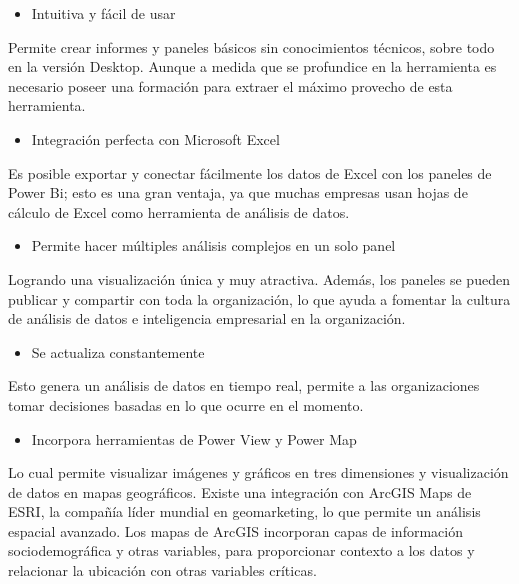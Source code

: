 \documentclass[
]{book}
\providecommand{\tightlist}{%
  \setlength{\itemsep}{0pt}\setlength{\parskip}{0pt}}
\begin{document}
\begin{itemize}
\tightlist
\item
  Intuitiva y fácil de usar
\end{itemize}

Permite crear informes y paneles básicos sin conocimientos técnicos, sobre todo en la versión Desktop. Aunque a medida que se profundice en la herramienta es necesario poseer una formación para extraer el máximo provecho de esta herramienta.

\begin{itemize}
\tightlist
\item
  Integración perfecta con Microsoft Excel
\end{itemize}

Es posible exportar y conectar fácilmente los datos de Excel con los paneles de Power Bi; esto es una gran ventaja, ya que muchas empresas usan hojas de cálculo de Excel como herramienta de análisis de datos.

\begin{itemize}
\tightlist
\item
  Permite hacer múltiples análisis complejos en un solo panel
\end{itemize}

Logrando una visualización única y muy atractiva. Además, los paneles se pueden publicar y compartir con toda la organización, lo que ayuda a fomentar la cultura de análisis de datos e inteligencia empresarial en la organización.

\begin{itemize}
\tightlist
\item
  Se actualiza constantemente
\end{itemize}

Esto genera un análisis de datos en tiempo real, permite a las organizaciones tomar decisiones basadas en lo que ocurre en el momento.

\begin{itemize}
\tightlist
\item
  Incorpora herramientas de Power View y Power Map
\end{itemize}

Lo cual permite visualizar imágenes y gráficos en tres dimensiones y visualización de datos en mapas geográficos. Existe una integración con ArcGIS Maps de ESRI, la compañía líder mundial en geomarketing, lo que permite un análisis espacial avanzado. Los mapas de ArcGIS incorporan capas de información sociodemográfica y otras variables, para proporcionar contexto a los datos y relacionar la ubicación con otras variables críticas.
\end{document}
